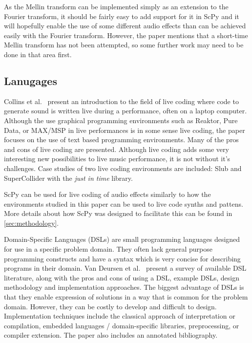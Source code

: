 \documentclass{article}
\begin{document}
As the Mellin transform can be implemented simply as an extension to the Fourier transform, it
should be fairly easy to add support for it in ScPy and it will hopefully enable the use of
some different audio effects than can be achieved easily with the Fourier transform. However, the
paper mentions that a short-time Mellin transform has not been attempted, so some further work may
need to be done in that area first.

\subsection{Lanugages}

Collins et al.~\cite{collins2003live} present an introduction to the field of live coding where
code to generate sound is written live during a performance, often on a laptop computer. Although
the use graphical programming environments such as Reaktor, Pure Data, or MAX/MSP in live
performances is in some sense live coding, the paper focuses on the use of text based programming
environments. Many of the pros and cons of live coding are presented. Although live coding adds
some very interesting new possibilities to live music performance, it is not without it's
challenges. Case studies of two live coding environments are included: Slub and SuperCollider with
the \textit{just in time} library.

ScPy can be used for live coding of audio effects similarly to how the environments studied in
this paper can be used to live code synths and pattens. More details about how ScPy was designed to
facilitate this can be found in \autoref{sec:methodology}.

Domain-Specific Languages (DSLs) are small programming languages designed for use in a specific
problem domain. They often lack general purpose programming constructs and have a syntax which is
very concise for describing programs in their domain. Van Deursen et al.~\cite{van2000domain}
present a survey of available DSL literature, along with the pros and cons of using a DSL, example
DSLs, design methodology and implementation approaches. The biggest advantage of DSLs is that they
enable expression of solutions in a way that is common for the problem domain. However, they can be
costly to develop and difficult to design. Implementation techniques include the classical approach
of interpretation or compilation, embedded languages / domain-specific libraries, preprocessing, or
compiler extension. The paper also includes an annotated bibliography.
\end{document}

